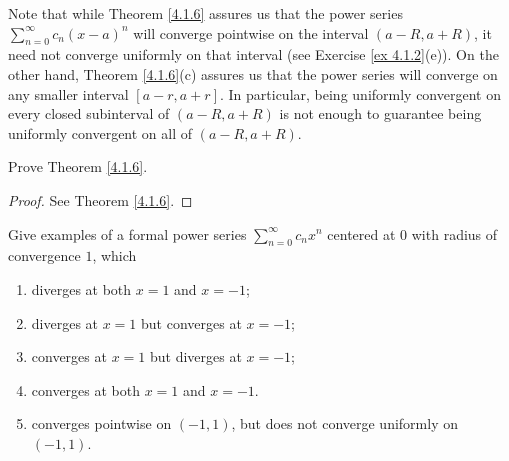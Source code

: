 \begin{remark}\label{4.1.9}
    Note that while Theorem \ref{4.1.6} assures us that the power series \(\sum_{n = 0}^\infty c_n (x - a)^n\) will converge pointwise on the interval \((a - R, a + R)\), it need not converge uniformly on that interval
    (see Exercise \ref{ex 4.1.2}(e)).
    On the other hand, Theorem \ref{4.1.6}(c) assures us that the power series will converge on any smaller interval \([a - r, a + r]\).
    In particular, being uniformly convergent on every closed subinterval of \((a - R, a + R)\) is not enough to guarantee being uniformly convergent on all of \((a - R, a + R)\).
\end{remark}

\exercisesection

\begin{exercise}\label{ex 4.1.1}
    Prove Theorem \ref{4.1.6}.
\end{exercise}

\begin{proof}
    See Theorem \ref{4.1.6}.
\end{proof}

\begin{exercise}\label{ex 4.1.2}
    Give examples of a formal power series \(\sum_{n = 0}^\infty c_n x^n\) centered at \(0\) with radius of convergence \(1\), which
    \begin{enumerate}
        \item diverges at both \(x = 1\) and \(x = -1\);
        \item diverges at \(x = 1\) but converges at \(x = -1\);
        \item converges at \(x = 1\) but diverges at \(x = -1\);
        \item converges at both \(x = 1\) and \(x = -1\).
        \item converges pointwise on \((-1, 1)\), but does not converge uniformly on \((-1, 1)\).
    \end{enumerate}
\end{exercise}